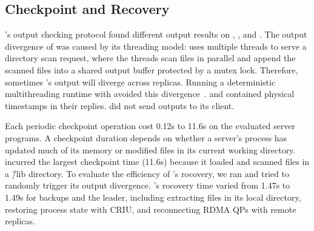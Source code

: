 




\subsection{Checkpoint and Recovery} \label{sec:robust}

\xxx's output checking protocol found different output results on \clamav,
\openldap, and \mediatomb. The output divergence of \clamav was caused by its
threading model: \clamav uses multiple threads to serve a directory scan
request, where the threads scan files in parallel and append the scanned files
into a shared output buffer protected by a mutex lock. Therefore, sometimes
\clamav's output will diverge across replicas. Running a deterministic
multithreading runtime with \clamav avoided this divergence~\cite{crane:sosp15}.
\openldap and \mediatomb contained physical timestamps in their replies.
\calvin did not send outputs to its client.


Each \xxx periodic checkpoint operation cost 0.12s to 11.6s on the
evaluated server programs. A checkpoint duration depends on whether a
server's process has updated much of its memory or modified files in its
current working directory. \clamav incurred the largest checkpoint time (11.6s)
because it loaded and scanned files in a \v{/lib} directory. To evaluate the
efficiency of \xxx's rocovery, we ran \clamav and tried to randomly trigger its
output divergence. \clamav's rocovery time varied from 1.47s to 1.49s for
backups and the leader, including extracting files in its local directory,
restoring process state with CRIU, and reconnecting RDMA QPs with remote
replicas.








